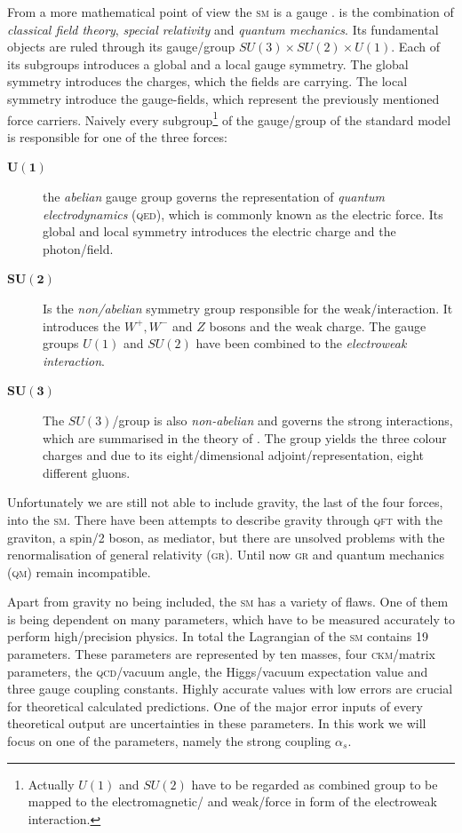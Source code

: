\documentclass[../../index.tex]{subfiles}
\begin{document}
From a more mathematical point of view the \textsc{sm} is a gauge
. is the combination of \textit{classical
  field theory}, \textit{special relativity} and \textit{quantum mechanics}. Its
fundamental objects are ruled through its gauge\-/group $SU(3)\times SU(2)\times
U(1)$. Each of its subgroups introduces a global and a local gauge symmetry. The
global symmetry introduces the charges, which the fields are carrying. The local
symmetry introduce the gauge-fields, which represent the previously mentioned
force carriers. Naively every subgroup\footnote{Actually $U(1)$ and $SU(2)$ have
  to be regarded as combined group to be mapped to the electromagnetic\-/ and
  weak\-/force in form of the electroweak interaction.} of the gauge\-/group of
the standard model is responsible for one of the three forces:
\begin{description}
\item[$\bm{U(1)}$] the \textit{abelian} gauge group governs the representation
  of \textit{quantum electrodynamics} (\textsc{qed}), which is commonly known as
  the electric force. Its global and local symmetry introduces the electric
  charge and the photon\-/field.
\item[$\bm{SU(2)}$] Is the \textit{non\-/abelian} symmetry group responsible for
  the weak\-/interaction. It introduces the $W^+,W^-$ and $Z$ bosons and the
  weak charge. The gauge groups $U(1)$ and $SU(2)$ have been combined to the
  \textit{electroweak interaction}.
\item[$\bm{SU(3)}$] The $SU(3)$\-/group is also \textit{non-abelian} and governs
  the strong interactions, which are summarised in the theory of
  . The group yields the three colour
  charges and due to its eight\-/dimensional adjoint\-/representation, eight
  different gluons.
\end{description}
Unfortunately we are still not able to include gravity, the last of the four
forces, into the \textsc{sm}. There have been attempts to describe gravity
through \textsc{qft} with the graviton, a spin\-/2 boson, as mediator, but there
are unsolved problems with the renormalisation of general relativity
(\textsc{gr}). Until now \textsc{gr} and quantum mechanics (\textsc{qm}) remain
incompatible.

Apart from gravity no being included, the \textsc{sm} has a variety of flaws.
One of them is being dependent on many parameters, which have to be measured
accurately to perform high\-/precision physics. In total the Lagrangian of the
\textsc{sm} contains 19 parameters. These parameters are represented by ten
masses, four \textsc{ckm}\-/matrix parameters, the \textsc{qcd}\-/vacuum angle,
the Higgs\-/vacuum expectation value and three gauge coupling constants. Highly
accurate values with low errors are crucial for theoretical calculated
predictions. One of the major error inputs of every theoretical output are
uncertainties in these parameters. In this work we will focus on one of the
parameters, namely the strong coupling $\alpha_s$.
\end{document}
